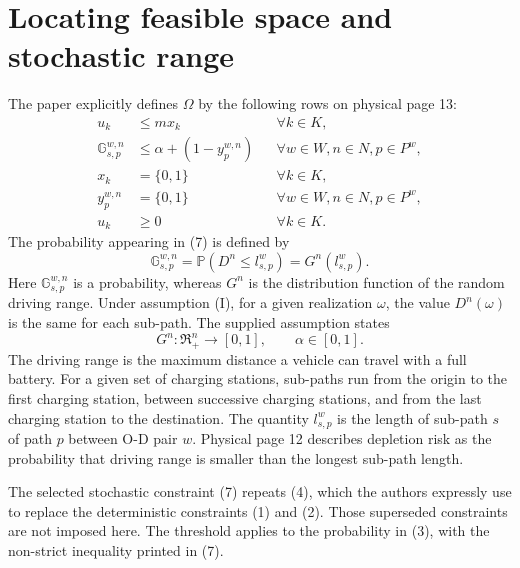 \documentclass{article}
\begin{document}
\section*{Locating feasible space and stochastic range}
The paper explicitly defines $\Omega$ by the following rows on physical page 13:
\begin{align}
u_k&\leq mx_k &&\forall k\in K,\tag{6}\\
\mathbb G_{s,p}^{w,n}&\leq\alpha+(1-y_p^{w,n})
&&\forall w\in W,n\in N,p\in P^w,\tag{7}\\
x_k&=\{0,1\} &&\forall k\in K,\tag{8}\\
y_p^{w,n}&=\{0,1\} &&\forall w\in W,n\in N,p\in P^w,\tag{9}\\
u_k&\geq0 &&\forall k\in K.\tag{10}
\end{align}
The probability appearing in (7) is defined by
\begin{equation}
\mathbb G_{s,p}^{w,n}=\mathbb P\left(D^n\leq l_{s,p}^w\right)
=G^n(l_{s,p}^w).\tag{3}
\end{equation}
Here $\mathbb G_{s,p}^{w,n}$ is a probability, whereas $G^n$ is the distribution function of the random driving range. Under assumption (I), for a given realization $\omega$, the value $D^n(\omega)$ is the same for each sub-path. The supplied assumption states
\[
G^n:\Re_+^n\longrightarrow[0,1],\qquad \alpha\in[0,1].
\]
The driving range is the maximum distance a vehicle can travel with a full battery. For a given set of charging stations, sub-paths run from the origin to the first charging station, between successive charging stations, and from the last charging station to the destination. The quantity $l_{s,p}^w$ is the length of sub-path $s$ of path $p$ between O-D pair $w$. Physical page 12 describes depletion risk as the probability that driving range is smaller than the longest sub-path length.

The selected stochastic constraint (7) repeats (4), which the authors expressly use to replace the deterministic constraints (1) and (2). Those superseded constraints are not imposed here. The threshold applies to the probability in (3), with the non-strict inequality printed in (7).
\end{document}
